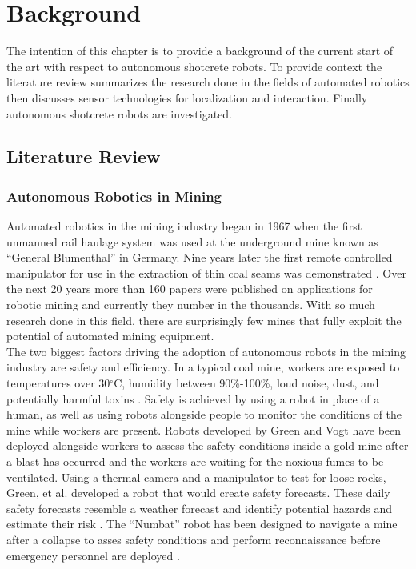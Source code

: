 \chapter{Background}
\label{chap:background}

The intention of this chapter is to provide a background of the current start of the art with respect to autonomous shotcrete robots. To provide context the literature review summarizes the research done in the fields of automated robotics then discusses sensor technologies for localization and interaction. Finally autonomous shotcrete robots are investigated.\\

\section{Literature Review}
\subsection{Autonomous Robotics in Mining}
Automated robotics in the mining industry began in 1967 when the first unmanned rail haulage system was used at the underground mine known as ``General Blumenthal'' in Germany. Nine years later the first remote controlled manipulator for use in the extraction of thin coal seams was demonstrated \cite{mani}. Over the next 20 years more than 160 papers were published on applications for robotic mining and currently they number in the thousands. With so much research done in this field, there are surprisingly few mines that fully exploit the potential of automated mining equipment.\\

The two biggest factors driving the adoption of autonomous robots in the mining industry are safety and efficiency. In a typical coal mine, workers are exposed to temperatures over 30$^\circ$C, humidity between 90\%-100\%, loud noise, dust, and potentially harmful toxins \cite{temp}. Safety is achieved by using a robot in place of a human, as well as using robots alongside people to monitor the conditions of the mine while workers are present. Robots developed by Green \cite{green} and Vogt \cite{vogt} have been deployed alongside workers to assess the safety conditions inside a gold mine after a blast has occurred and the workers are waiting for the noxious fumes to be ventilated. Using a thermal camera and a manipulator to test for loose rocks, Green, et al. developed a robot that would create safety forecasts. These daily safety forecasts resemble a weather forecast and identify potential hazards and estimate their risk \cite{greener}. The ``Numbat'' robot has been designed to navigate a mine after a collapse to asses safety conditions and perform reconnaissance before emergency personnel are deployed \cite{numbat2}.\\

